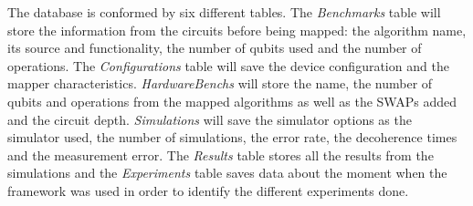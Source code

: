 \begin{enumerate}
The database is conformed by six different tables.
The \emph{Benchmarks} table will store the information from the circuits before being mapped: the algorithm name, its source and functionality, the number of qubits used and the number of operations.
The \emph{Configurations} table will save the device configuration and the mapper characteristics.
\emph{HardwareBenchs} will store the name, the number of qubits and operations from the mapped algorithms as well as the SWAPs added and the circuit depth.
\emph{Simulations} will save the simulator options as the simulator used, the number of simulations, the error rate, the decoherence times and the measurement error.
The \emph{Results} table stores all the results from the simulations and the \emph{Experiments} table saves data about the moment when the framework was used in order to identify the different experiments done.
\end{enumerate}
